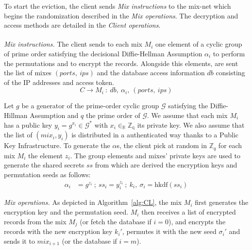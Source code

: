 \documentclass[USenglish,oneside,twocolumn]{article}
\begin{document}
To start the eviction, the client sends \emph{Mix instructions} to the mix-net which  begins the randomization described in the \emph{Mix operations}. The decryption and access methods are detailed in the \emph{Client operations}.\\\\

\noindent\textit{Mix instructions.}
The client sends to each mix $M_i$ one element of a cyclic group of prime order satisfying the decisional Diffie-Hellman Assumption $\alpha_i$ to perform the permutations and to encrypt the records. Alongside this elements, are sent the list of mixes $(ports,\ ips)$ and the database access information $db$ consisting of the IP addresses and access token.
$$ C \rightarrow M_i\ :\ db,\ \alpha_{i},\ (ports,\ ips) $$

Let $g$ be a generator of the prime-order cyclic group $\mathcal{G}$ satisfying the Diffie-Hillman Assumption and $q$ the prime order of $\mathcal{G}$. We assume that each mix $M_i$ has a public key $y_i=g^{x_i}\in \mathcal{G}^*$ with $x_i \in_{\mathbb{R}} \mathbb{Z_q}$ its private key. We also assume that the list of $(mix_i, y_i)$ is distributed in a authenticated way thanks to a Public Key Infrastructure.
To generate the $\alpha$s, the client pick at random in $\mathbb{Z}_q$ for each mix $M_i$ the element $z_i$. The group elements and mixes' private keys are used to generate the shared secrets $ss$ from which are derived the encryption keys and permutation seeds as follows:
\begin{align*}
\alpha_i &= g^{z_i}\ ;\ ss_i = y_i^{z_i}\ ;\ k_i,\ \sigma_i=\text{hkdf}(ss_i)
\end{align*}

\noindent\textit{Mix operations.} As depicted in Algorithm~\ref{alg:CL}, the mix $M_i$ first generates the encryption key and the permutation seed. $M_i$ then receives a list of encrypted records from the mix $M_j$ (or fetch the database if $i=0$), and encrypts the records with the new encryption key $k_i'$, permutes it with the new seed $\sigma_{i}'$ and sends it to $mix_{i+1}$ (or the database if $i=m$).\\
\end{document}
